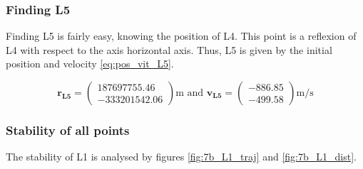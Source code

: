 \documentclass[a4paper,12pt,twoside]{article}
\begin{document}
\subsubsection{Finding L5}
Finding L5 is fairly easy, knowing the position of L4.
This point is a reflexion of L4 with respect to the axis horizontal axis.
Thus, L5 is given by the initial position and velocity \ref{eq:pos_vit_L5}.

\begin{equation}
  \mathbf{r_\text{L5}} =
  \begin{pmatrix}
    \num{187697755.46} \\
    \num{-333201542.06}
  \end{pmatrix}
  \si{\m}
  \text{ and }
  \mathbf{v_\text{L5}} =
  \begin{pmatrix}
    \num{-886.85} \\
    \num{-499.58}
  \end{pmatrix}
  \si{\m\per\s}
  \label{eq:pos_vit_L5}
\end{equation}

\subsubsection{Stability of all points}
The stability of L1 is analysed by figures \ref{fig:7b_L1_traj} and \ref{fig:7b_L1_dist}.
\end{document}
